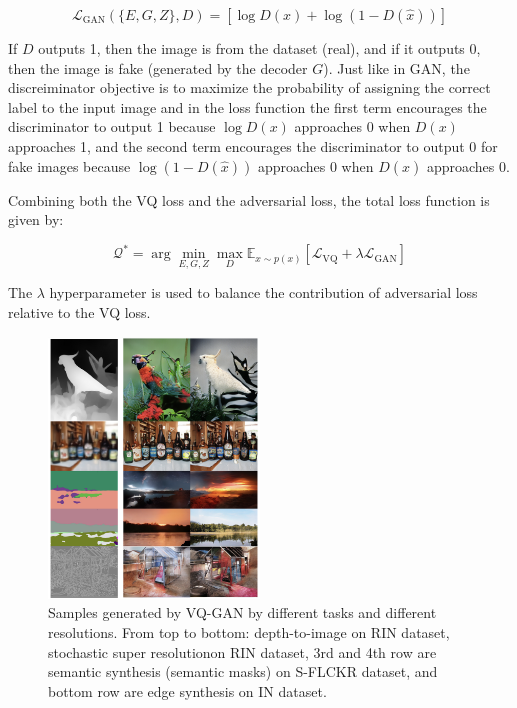 \begin{equation}
    \mathcal{L}_{\text{GAN}}(\{E,G,Z\}, D) = [\log D(x) + \log (1-D(\hat{x}))]
\end{equation}

If $D$ outputs 1, then the image is from the dataset (real), and if it outputs 0, then the image is fake (generated by the decoder $G$). Just like in GAN, the discreiminator objective is to maximize the probability of assigning the correct label to the input image and in the loss function the first term encourages the discriminator to output 1 because $\log D(x)$ approaches 0 when $D(x)$ approaches 1, and the second term encourages the discriminator to output 0 for fake images because $\log (1-D(\hat{x}))$ approaches 0 when $D(\hat{x})$ approaches 0.

Combining both the VQ loss and the adversarial loss, the total loss function is given by:

\begin{equation}
    \mathcal{Q^*} = \arg \min_{E, G, Z} \max_D \mathbb{E}_{x \sim p(x)} [\mathcal{L}_{\text{VQ}} + \lambda \mathcal{L}_{\text{GAN}}]
\end{equation}

The $\lambda$ hyperparameter is used to balance the contribution of adversarial loss relative to the VQ loss.

\begin{figure}
    \centering
    \includegraphics[width=0.5\textwidth]{images/vqgan_samples2.png}
    \caption[Caption for LOF]{Samples generated by VQ-GAN by different tasks and different resolutions. From top to bottom: depth-to-image on RIN dataset, stochastic super resolution\footnotemark on RIN dataset, 3rd and 4th row are semantic synthesis (semantic masks) on S-FLCKR dataset, and bottom row are edge synthesis on IN dataset.}
\end{figure}


